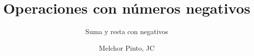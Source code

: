 \documentclass{guia}
\title{Operaciones con números negativos}
\subtitle{Suma y resta con negativos}
\author{Melchor Pinto, JC}
\begin{document}
%
\begin{questions}
\questionboxed{}
\end{questions}
\end{document}
